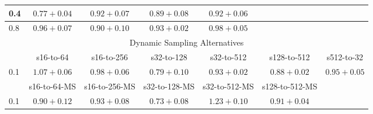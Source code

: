 \documentclass[10pt,journal,compsoc]{IEEEtran}
\begin{document}
\begin{table*}[!htbp]
\begin{center}
{\begin{tabular}{|l|c|c|c|c|c|c|}
\hline
0.4   & $0.77+0.04$ & $0.92+0.07$ & $0.89+0.08$ & $0.92+0.06$ & &  \\
\hline
0.8   & $0.96+0.07$ & $0.90+0.10$ & $0.93+0.02$ & $0.98+0.05$ & &  \\
\hline
\multicolumn{7}{|c|}{Dynamic Sampling Alternatives}\\
\hline
& s16-to-64 & s16-to-256  & s32-to-128 & s32-to-512 & s128-to-512 & s512-to-32 \\
\hline
0.1  & $1.07+0.06$ & $0.98+0.06$ & $0.79+0.10$ &  $0.93+0.02$ & $0.88+0.02$ & $0.95+0.05$ \\
\hline
& s16-to-64-MS & s16-to-256-MS & s32-to-128-MS & s32-to-512-MS & s128-to-512-MS & \\
\hline
0.1  & $0.90+0.12$ & $0.93+0.08$ & $0.73+0.08$ & $1.23+0.10$ & $0.91+0.04$ & \\
\hline


\end{tabular}}
\end{center}
\end{table*}
\end{document}

